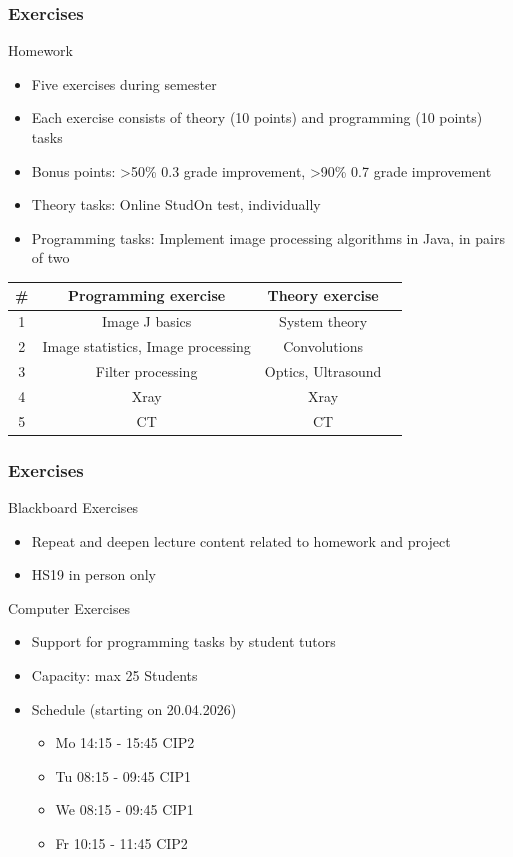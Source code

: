 \begin{frame}
	\frametitle{Exercises}
	\begin{block}{Homework}
		\begin{itemize}
			\item Five exercises during semester
			\item Each exercise consists of theory (10 points) and programming (10 points) tasks
			\item Bonus points: >50\% 0.3 grade improvement, >90\% 0.7 grade improvement
			\item Theory tasks: Online StudOn test, individually
			\item Programming tasks: Implement image processing algorithms in Java, in pairs of two
		\end{itemize}
		\begin{center}
			\begin{tabular}{c | c | c | c}
				\# & Programming exercise			& Theory exercise \\ \hline
				1  & Image J basics    				& System theory              \\
				2  & Image statistics, Image processing    	& Convolutions                    \\
				3  & Filter processing  				& Optics, Ultrasound           \\
				4  & Xray    						& Xray                	      \\
				5  & CT    							& CT                		     \\
			\end{tabular}
		\end{center}
	\end{block}
\end{frame}

\begin{frame}
	\frametitle{Exercises}
	\begin{block}{Blackboard Exercises}
		\begin{itemize}
			\item Repeat and deepen lecture content related to homework and project
			\item HS19 in person only
		\end{itemize}
	\end{block}
	\begin{block}{Computer Exercises}
		\begin{itemize}
			\item Support for programming tasks by student tutors
			\item Capacity: max 25 Students
			\item Schedule (starting on 20.04.2026)
			\begin{itemize}
				\item Mo 14:15 - 15:45 CIP2
				\item Tu 08:15 - 09:45 CIP1
				\item We 08:15 - 09:45 CIP1
				\item Fr 10:15 - 11:45 CIP2
			\end{itemize}
		\end{itemize}
	\end{block}
\end{frame}


